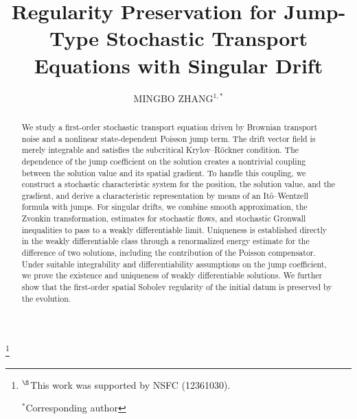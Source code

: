 \documentclass[12pt,oneside, reqno]{amsart}
\numberwithin{equation}{section}
\begin{document}
	\title{Regularity Preservation for Jump-Type Stochastic Transport Equations with Singular Drift}
	\date{}
	\author{MINGBO ZHANG${}^{1,\ast}$}
	
	
	\footnote[0]{$^{\S}$This work was supported by NSFC (12361030).
		
		${}^\ast$Corresponding author}
	\subjclass{}
	
	\date{}
	
	
	\begin{abstract}
		We study a first-order stochastic transport equation driven by Brownian transport noise and a nonlinear state-dependent Poisson jump term. The drift vector field is merely integrable and satisfies the subcritical Krylov--R\"ockner condition. The dependence of the jump coefficient on the solution creates a nontrivial coupling between the solution value and its spatial gradient. To handle this coupling, we construct a stochastic characteristic system for the position, the solution value, and the gradient, and derive a characteristic representation by means of an It\^o--Wentzell formula with jumps. For singular drifts, we combine smooth approximation, the Zvonkin transformation, estimates for stochastic flows, and stochastic Gronwall inequalities to pass to a weakly differentiable limit. Uniqueness is established directly in the weakly differentiable class through a renormalized energy estimate for the difference of two solutions, including the contribution of the Poisson compensator. Under suitable integrability and differentiability assumptions on the jump coefficient, we prove the existence and uniqueness of weakly differentiable solutions. We further show that the first-order spatial Sobolev regularity of the initial datum is preserved by the evolution. 
	\end{abstract}
	\maketitle
	\tableofcontents
	
\end{document}
